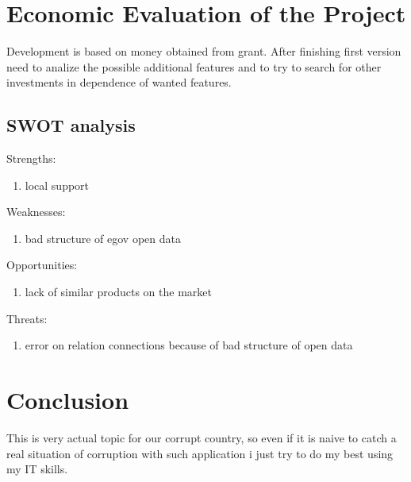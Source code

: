 \documentclass[12pt]{article}
\begin{document}
\newpage
\section{Economic Evaluation of the Project}

Development is based on money obtained from grant. After finishing first version need to analize the possible additional features and to try to search for other investments in dependence of wanted features.

\subsection{SWOT analysis}

Strengths:
\begin{enumerate}
\item local support
\end{enumerate}

Weaknesses:
\begin{enumerate}
\item bad structure of egov open data
\end{enumerate}

Opportunities:
\begin{enumerate}
\item lack of similar products on the market
\end{enumerate}

Threats:
\begin{enumerate}
\item error on relation connections because of bad  structure of open data
\end{enumerate}


\newpage
\section*{Conclusion}
    This is very actual topic for our corrupt country, so even if it is naive to catch a real situation of corruption with such application i just try to do my best using my IT skills.
\end{document}

